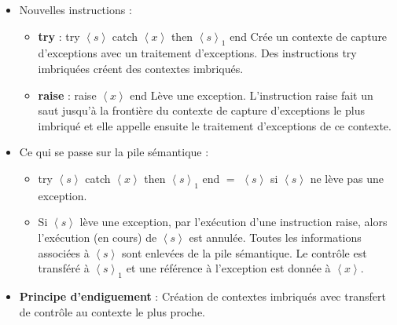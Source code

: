 \documentclass[fr,license=none,skiptoc]{../../../eplsummary}
\begin{document}
\begin{flushleft}
\begin{itemize}
\item Nouvelles instructions :

\begin{itemize}[label=\textbullet]
\item \textbf{try} : \textcolor{miorangerouge}{try $\left\langle s \right\rangle$ catch $\left\langle x \right\rangle$ then $\left\langle s \right\rangle_1$ end } Crée un contexte de capture d'exceptions avec un traitement d'exceptions. Des instructions try imbriquées créent des contextes imbriqués.


\item \textbf{raise} : \textcolor{miorangerouge}{raise $\left\langle x \right\rangle$ end } Lève une exception. L'instruction raise fait un saut jusqu'à la frontière du contexte de capture d'exceptions le plus imbriqué et elle appelle ensuite le traitement d'exceptions de ce contexte.
\end{itemize}

\item Ce qui se passe sur la pile sémantique :
\begin{itemize}[label=\textbullet]
\item \textcolor{miorangerouge}{try $\left\langle s \right\rangle$ catch $\left\langle x \right\rangle$ then $\left\langle s \right\rangle_1$ end } $=$ \textcolor{miorangerouge}{$\left\langle s \right\rangle$} si \textcolor{miorangerouge}{$\left\langle s \right\rangle$} ne lève pas une exception.
\item Si \textcolor{miorangerouge}{$\left\langle s \right\rangle$} lève une exception, par l'exécution d'une instruction \textcolor{miorangerouge}{raise}, alors l'exécution (en cours) de \textcolor{miorangerouge}{$\left\langle s \right\rangle$} est annulée. Toutes les informations associées à \textcolor{miorangerouge}{$\left\langle s \right\rangle$} sont enlevées de la pile sémantique. Le contrôle est transféré à \textcolor{miorangerouge}{$\left\langle s \right\rangle_1$} et une référence à l'exception est donnée à \textcolor{miorangerouge}{$\left\langle x \right\rangle$}.

\end{itemize}

\item \textbf{Principe d'endiguement} : Création de contextes imbriqués avec transfert de contrôle au contexte le plus proche.

\end{itemize}


\end{flushleft}
\end{document}
